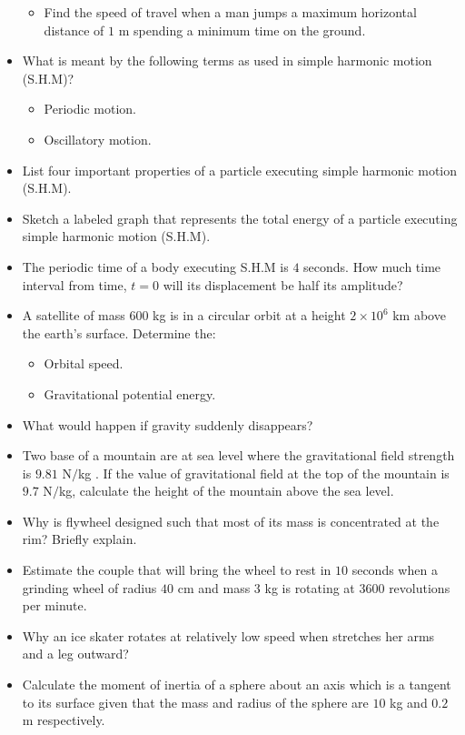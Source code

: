 \documentclass{article}
\begin{document}
\begin{itemize}
\begin{itemize}
\item Find the speed of travel when a man jumps a maximum horizontal distance of $ 1$ m spending a minimum time on the ground.
\end{itemize}
\item What is meant by the following terms as used in simple harmonic motion (S.H.M)?
 \begin{itemize}
\item Periodic motion. 
\item Oscillatory motion. 
\end{itemize}
\item List four important properties of a particle executing simple harmonic motion (S.H.M). 
\item Sketch a labeled graph that represents the total energy of a particle executing simple harmonic motion (S.H.M). 
\item The periodic time of a body executing S.H.M is $ 4$ seconds. How much time interval from time, $ t=0$ will its displacement be half its amplitude? 
\item A satellite of mass $ 600$ kg is in a circular orbit at a height $ 2 \times 10^{6}$ km above the earth’s surface. Determine the:
 \begin{itemize}
\item Orbital speed. 
\item Gravitational potential energy. 
\end{itemize}
\item What would happen if gravity suddenly disappears?  
\item Two base of a mountain are at sea level where the gravitational field strength is $ 9.81$ N$/$kg . If the value of gravitational field at the top of the mountain is $ 9.7$ N$/$kg, calculate the height of the mountain above the sea level. 
\item Why is flywheel designed such that most of its mass is concentrated at the rim? Briefly explain. 
\item Estimate the couple that will bring the wheel to rest in $ 10$ seconds when a grinding wheel of radius $ 40$ cm and mass $ 3$ kg is rotating at $ 3600$ revolutions per minute. 
\item Why an ice skater rotates at relatively low speed when stretches her arms and a leg outward? 
\item Calculate the moment of inertia of a sphere about an axis which is a tangent to its surface given that the mass and radius of the sphere are $ 10$ kg and $ 0.2$ m respectively. 

\end{itemize}
\end{document}
